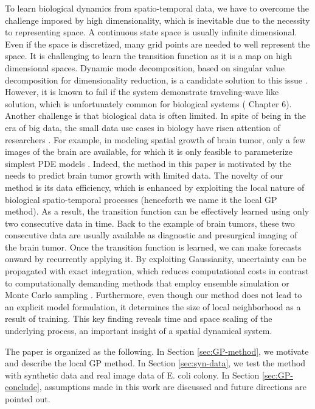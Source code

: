 \documentclass[smallextended,natbib]{svjour3}       %
\begin{document}
To learn biological dynamics from spatio-temporal data, we have to overcome the challenge imposed by high dimensionality, which is inevitable due to the necessity to representing space. A continuous state space is usually infinite dimensional. Even if the space is discretized, many grid points are needed to well represent the space. It is challenging to learn the transition function as it is a map on high dimensional spaces. Dynamic mode decomposition, based on singular value decomposition for dimensionality reduction, is a candidate solution to this issue \citep{schmid2010dynamic}. However, it is known to fail if the system demonstrate traveling-wave like solution, which is unfortunately common for biological systems (\citep{Brunton2019} Chapter 6). Another challenge is that biological data is often limited. In spite of being in the era of big data, the small data use cases in biology have risen attention of researchers \citep{Lagergren2020}.  For example, in modeling spatial growth of brain tumor, only a few images of the brain are available, for which it is only feasible to parameterize simplest PDE models \citep{Han2019b,lipkova2019personalized,McDaniel2013}. Indeed, the method in this paper is motivated by the needs to predict brain tumor growth with limited data. The novelty of our method is its data efficiency, which is enhanced by exploiting the local nature of biological spatio-temporal processes (henceforth we name it the local GP method). As a result, the transition function can be effectively learned using only two consecutive data in time. Back to the example of brain tumors, these two consecutive data are usually available as diagnostic and presurgical imaging of the brain tumor. Once the transition function is learned, we can make forecasts onward by recurrently applying it. By exploiting Gaussianity, uncertainty can be propagated with exact integration, which reduces computational costs in contrast to computationally demanding methods that employ ensemble simulation or Monte Carlo sampling \citep{lipkova2019personalized,McDaniel2013}. Furthermore, even though our method does not lead to an explicit model formulation, it determines the size of local neighborhood as a result of training. This key finding reveals time and space scaling of the underlying process, an important insight of a spatial dynamical system.  
               
The paper is organized as the following. In Section \ref{sec:GP-method}, we motivate and describe the local GP method. In Section \ref{sec:syn-data}, we test the method with synthetic data and real image data of E. coli colony. In Section \ref{sec:GP-conclude}, assumptions made in this work are discussed and future directions are pointed out.
\end{document}
